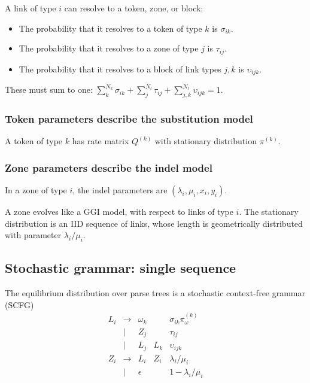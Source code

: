 \documentclass{article}
\begin{document}
A link of type $i$ can resolve to a token, zone, or block:
\begin{itemize}
\item
The probability that it resolves to a token of type $k$ is $\sigma_{ik}$.
\item
The probability that it resolves to a zone of type $j$ is $\tau_{ij}$.
\item
The probability that it resolves to a block of link types $j,k$ is $\upsilon_{ijk}$.
\end{itemize}
These must sum to one: $\sum_k^{N_k}\sigma_{ik} + \sum_j^{N_l}\tau_{ij} + \sum_{j,k}^{N_l}\upsilon_{ijk} = 1$.

\subsubsection{Token parameters describe the substitution model}

A token of type $k$ has rate matrix $Q^{(k)}$ with stationary distribution $\pi^{(k)}$.

\subsubsection{Zone parameters describe the indel model}

In a zone of type $i$, the indel parameters are $(\lambda_i,\mu_i,x_i,y_i)$.

A zone evolves like a GGI model, with respect to links of type $i$.
The stationary distribution is an IID sequence of links, whose length is geometrically distributed with parameter $\lambda_i/\mu_i$.

\subsection{Stochastic grammar: single sequence}

The equilibrium distribution over parse trees is a stochastic context-free grammar (SCFG)
\[
\begin{array}{rclll}
  L_i & \to & \omega_k & & \sigma_{ik} \pi^{(k)}_{\omega} \\
      & | & Z_j & & \tau_{ij} \\
      & | & L_j & L_k & \upsilon_{ijk} \\
  Z_i & \to & L_i & Z_i & \lambda_i/\mu_i \\
        & | & \epsilon & & 1 - \lambda_i/\mu_i \\
\end{array}
\]
\end{document}
